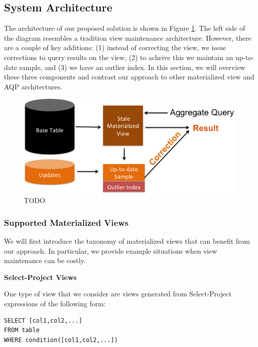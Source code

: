\subsection{System Architecture}
The architecture of our proposed solution is shown in Figure \ref{sys-arch}.
The left side of the diagram resembles a tradition view maintenance architecture.
However, there are a couple of key additions: (1) instead of correcting the view,
we issue corrections to query results on the view, (2) to acheive this we maintain
an up-to-date sample, and (3) we have an outlier index.
In this section, we will overview these three components and contrast our approach 
to other materialized view and AQP architectures.

\begin{figure}[h]
\label{sys-arch}
\centering
 \includegraphics[width=\columnwidth]{figs/sys-arch.png}
 \caption{TODO}
\end{figure}

\subsubsection{Supported Materialized Views}\label{subsubsec:supported-view}
We will first introduce the taxonomy of materialized views
that can benefit from our approach. In particular, we provide example
situations when view maintenance can be costly. 

\vspace{1em}

\noindent\textbf{Select-Project Views}

One type of view that we consider are views generated from Select-Project
expressions of the following form:

\begin{lstlisting}
SELECT [col1,col2,...] 
FROM table 
WHERE condition([col1,col2,...]) 
\end{lstlisting}

